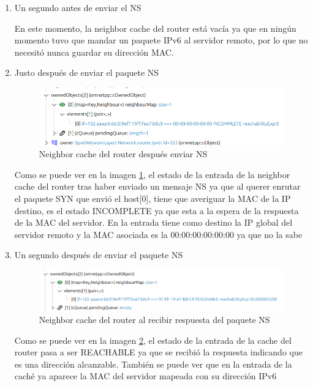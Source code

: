 \begin{enumerate}
    \item Un segundo antes de enviar el NS

    En este momento, la neighbor cache del router está vacía ya que en ningún momento tuvo que mandar un paquete IPv6 al servidor remoto, por lo que no necesitó nunca guardar su dirección MAC.

    \item Justo después de enviar el paquete NS
    
    \begin{figure}[H]
        \centering
        \includegraphics[width=135mm, scale=0.75]{imaxes/captura_ejer4_31.png}
        \caption{Neighbor cache del router después enviar NS}
        \label{fig:paquete_ns_t6}
    \end{figure}

   Como se puede ver en la imagen \ref{fig:paquete_ns_t6}, el estado de la entrada de la neighbor cache del router tras haber enviado un mensaje NS ya que al querer enrutar el paquete SYN que envió el host[0], tiene que averiguar la MAC de la IP destino, es el estado INCOMPLETE ya que esta a la espera de la respuesta de la MAC del servidor. En la entrada tiene como destino la IP global del servidor remoto y la MAC asociada es la 00:00:00:00:00:00 ya que no la sabe

    \item Un segundo después de enviar el paquete NS
    \begin{figure}[H]
        \centering
        \includegraphics[width=135mm, scale=0.75]{imaxes/captura_ejer4_32.png}
        \caption{Neighbor cache del router al recibir respuesta del paquete NS}
        \label{fig:respuesta_ns_t6}
    \end{figure}

    Como se puede ver en la imagen \ref{fig:respuesta_ns_t6}, el estado de la entrada de la cache del router pasa a ser REACHABLE ya que se recibió la respuesta indicando que es una dirección alcanzable. También se puede ver que en la entrada de la caché ya aparece la MAC del servidor mapeada con su dirección IPv6 

\end{enumerate}



